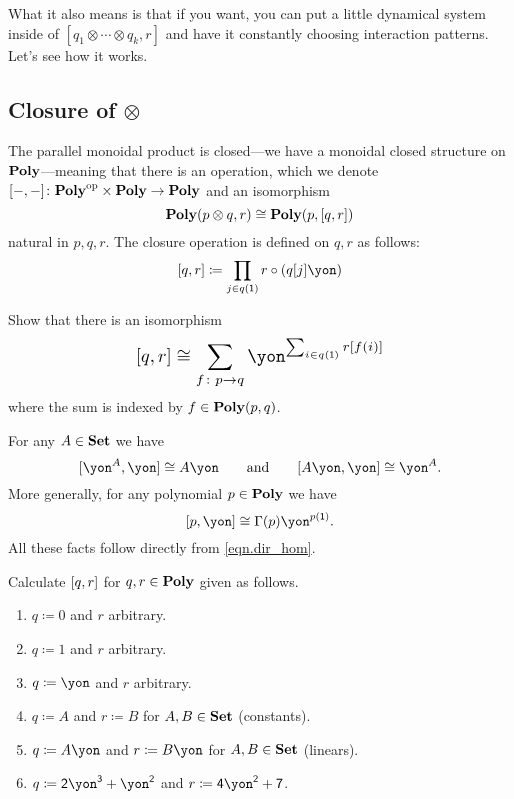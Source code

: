 \documentclass[Book-Poly]{subfiles}
\begin{document}
What it also means is that if you want, you can put a little dynamical system inside of $[q_1\otimes\cdots\otimes q_k,r]$ and have it constantly choosing interaction patterns. Let's see how it works.


\subsection{Closure of $\otimes$}%


The parallel monoidal product is closed---we have a monoidal closed structure on $\mathbf{Poly}$---meaning that there is an operation, which we denote $[-,-]\colon\mathbf{Poly}^{\textnormal{op}}\times\mathbf{Poly}\to\mathbf{Poly}$ and an isomorphism
\begin{equation}\label{eqn.monoidal_closure}
  \mathbf{Poly}(p\otimes q,r)\cong\mathbf{Poly}(p,[q,r])
\end{equation}
natural in $p,q,r$. The closure operation is defined on $q,r$ as follows:
\begin{equation}\label{eqn.dir_hom}
	\ihom{q,r}\coloneqq\prod_{j\in q(\1)}r\circ(q[j]\yon)
\end{equation}

\begin{exercise}
Show that there is an isomorphism
\[
\scalebox{1.3}{$\displaystyle
[q,r]\cong\sum_{f\colon p\to q}\yon^{\sum_{i\in q(\1)}r[f(i)]}
$}
\]
where the sum is indexed by $f\in\mathbf{Poly}(p,q)$.
\end{exercise}

\begin{example}\label{ex.dirichlet_dual}
For any $A\in\mathbf{Set}$ we have
\[
  \ihom{\yon^A,\yon}\cong A\yon
  \qqand
  \ihom{A\yon,\yon}\cong\yon^A.
\]
More generally, for any polynomial $p\in\mathbf{Poly}$ we have
\begin{equation}\label{eqn.dir_dual}
  [p,\yon]\cong\Gamma(p)\yon^{p(\1)}.
\end{equation}
All these facts follow directly from \eqref{eqn.dir_hom}.
\end{example}

\begin{exercise}
Calculate $[q,r]$ for $q,r\in\mathbf{Poly}$ given as follows.
\begin{enumerate}
	\item $q\coloneqq 0$ and $r$ arbitrary.
	\item $q\coloneqq 1$ and $r$ arbitrary.
	\item $q\coloneqq\yon$ and $r$ arbitrary.
	\item $q\coloneqq A$ and $r\coloneqq B$ for $A,B\in\mathbf{Set}$ (constants).
	\item $q\coloneqq A\yon$ and $r\coloneqq B\yon$ for $A,B\in\mathbf{Set}$ (linears).
	\item $q\coloneqq\2\yon^\3+\yon^\2$ and $r\coloneqq\4\yon^\2+\7$.
\qedhere
\end{enumerate}
\end{exercise}
\end{document}
